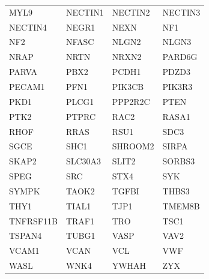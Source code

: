\begin{longtable}{llll}
MYL9 & NECTIN1 & NECTIN2 & NECTIN3 \\
NECTIN4 & NEGR1 & NEXN & NF1 \\
NF2 & NFASC & NLGN2 & NLGN3 \\
NRAP & NRTN & NRXN2 & PARD6G \\
PARVA & PBX2 & PCDH1 & PDZD3 \\
PECAM1 & PFN1 & PIK3CB & PIK3R3 \\
PKD1 & PLCG1 & PPP2R2C & PTEN \\
PTK2 & PTPRC & RAC2 & RASA1 \\
RHOF & RRAS & RSU1 & SDC3 \\
SGCE & SHC1 & SHROOM2 & SIRPA \\
SKAP2 & SLC30A3 & SLIT2 & SORBS3 \\
SPEG & SRC & STX4 & SYK \\
SYMPK & TAOK2 & TGFBI & THBS3 \\
THY1 & TIAL1 & TJP1 & TMEM8B \\
TNFRSF11B & TRAF1 & TRO & TSC1 \\
TSPAN4 & TUBG1 & VASP & VAV2 \\
VCAM1 & VCAN & VCL & VWF \\
WASL & WNK4 & YWHAH & ZYX \\
\end{longtable}
